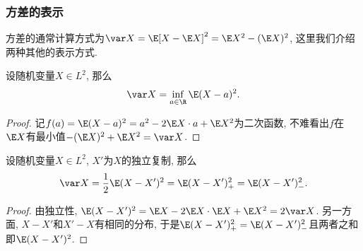 \subsubsection{方差的表示}

方差的通常计算方式为$\var X = \E[X - \E X]^2 = \E X^2 - (\E X)^2$, 这里我们介绍两种其他的表示方式. 

\begin{lemma}[方差的变分表示]
	设随机变量$X \in L^2$, 那么
	\begin{equation*}
		\var X = \inf_{a \in \R} \E (X - a)^2. 
	\end{equation*}
\end{lemma}
\begin{proof}
	记$f(a) =  \E (X - a)^2 = a^2 - 2 \E X \cdot a + \E X^2$为二次函数, 不难看出$f$在$\E X$有最小值$- (\E X)^2 + \E X^2 = \var X$. 
\end{proof}

\begin{lemma}[独立复制]
	设随机变量$X \in L^2$, $X'$为$X$的独立复制, 那么
	\begin{equation*}
		\var X = \frac12 \E (X - X')^2
		= \E (X - X')_+^2 = \E (X - X')_-^2. 
	\end{equation*}
\end{lemma}
\begin{proof}
	由独立性, $\E (X - X')^2 = \E X - 2 \E X \cdot \E X + \E X^2 = 2 \var X$. 
	另一方面, $X - X'$和$X' - X$有相同的分布, 于是$\E(X - X')_+^2 = \E(X - X')_-^2$且两者之和即$\E (X - X')^2$. 
\end{proof}

